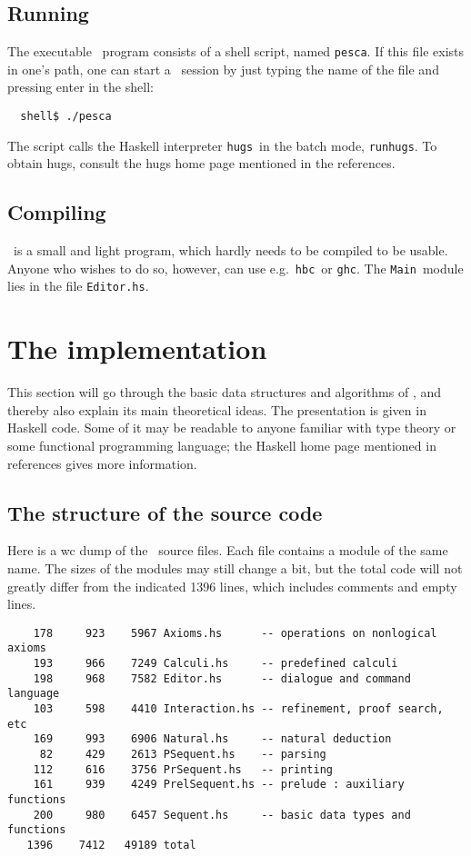 \subsection{Running \PESC}

The executable \PESC\ program consists of a shell script, named
{\tt pesca}.
If this file exists in one's path, one can start a \PESC\ session by
just typing the name of the file and pressing enter in the shell:
\begin{verbatim}
  shell$ ./pesca
\end{verbatim}
The script calls the Haskell
interpreter {\tt hugs}\ in the batch mode, {\tt runhugs}.
To obtain hugs, consult the hugs home page mentioned in the references.



\subsection{Compiling \PESC}

\PESC\ is a small and light program, which hardly needs to be compiled to
be usable. Anyone who wishes to do so, however, can use
e.g.\ {\tt hbc}\ or {\tt ghc}. The {\tt Main}\ module lies in the file
{\tt Editor.hs}.



\section{The implementation}

This section will go through the basic data structures and algorithms of \PESC,
and thereby also explain its main theoretical ideas. The presentation is given in
Haskell code. Some of it may be readable to anyone familiar with type theory or some
functional programming language; the Haskell home page mentioned in references
gives more information.


\subsection{The structure of the source code}

Here is a wc dump of the \PESC\ source files. Each file
contains a module of the same name. The sizes of the modules may
still change a bit, but the total code will not greatly differ from
the indicated 1396 lines, which includes comments and empty lines. 
\begin{verbatim}
    178     923    5967 Axioms.hs      -- operations on nonlogical axioms
    193     966    7249 Calculi.hs     -- predefined calculi
    198     968    7582 Editor.hs      -- dialogue and command language
    103     598    4410 Interaction.hs -- refinement, proof search, etc
    169     993    6906 Natural.hs     -- natural deduction
     82     429    2613 PSequent.hs    -- parsing
    112     616    3756 PrSequent.hs   -- printing 
    161     939    4249 PrelSequent.hs -- prelude : auxiliary functions
    200     980    6457 Sequent.hs     -- basic data types and functions
   1396    7412   49189 total
\end{verbatim}


